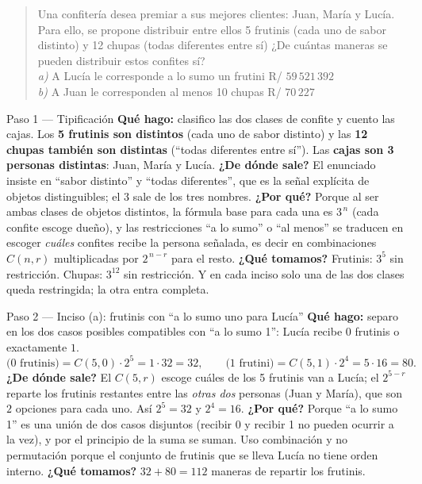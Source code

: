 \documentclass[11pt]{article}
\begin{document}
\begin{quote}
Una confitería desea premiar a sus mejores clientes: Juan, María y Lucía. Para ello, se propone distribuir entre ellos 5 frutinis (cada uno de sabor distinto) y 12 chupas (todas diferentes entre sí) ¿De cuántas maneras se pueden distribuir estos confites sí?\\
\textit{a)} A Lucía le corresponde a lo sumo un frutini \hfill R/ $59\,521\,392$\\
\textit{b)} A Juan le corresponden al menos 10 chupas \hfill R/ $70\,227$
\end{quote}

\begin{paso}{Paso 1 --- Tipificación}
\textbf{Qué hago:} clasifico las dos clases de confite y cuento las cajas.
Los \textbf{5 frutinis son distintos} (cada uno de sabor distinto) y las \textbf{12 chupas también son distintas} (``todas diferentes entre sí''). Las \textbf{cajas son 3 personas distintas}: Juan, María y Lucía.
\textbf{¿De dónde sale?} El enunciado insiste en ``sabor distinto'' y ``todas diferentes'', que es la señal explícita de objetos distinguibles; el $3$ sale de los tres nombres.
\textbf{¿Por qué?} Porque al ser ambas clases de objetos distintos, la fórmula base para cada una es $3^{\,n}$ (cada confite escoge dueño), y las restricciones ``a lo sumo'' o ``al menos'' se traducen en escoger \emph{cuáles} confites recibe la persona señalada, es decir en combinaciones $C(n,r)$ multiplicadas por $2^{\,n-r}$ para el resto.
\textbf{¿Qué tomamos?} Frutinis: $3^5$ sin restricción. Chupas: $3^{12}$ sin restricción. Y en cada inciso solo una de las dos clases queda restringida; la otra entra completa.
\end{paso}

\begin{paso}{Paso 2 --- Inciso (a): frutinis con ``a lo sumo uno para Lucía''}
\textbf{Qué hago:} separo en los dos casos posibles compatibles con ``a lo sumo 1'': Lucía recibe $0$ frutinis o exactamente $1$.
\[
\text{(0 frutinis)}=C(5,0)\cdot 2^5=1\cdot 32=32,\qquad
\text{(1 frutini)}=C(5,1)\cdot 2^4=5\cdot 16=80 .
\]
\textbf{¿De dónde sale?} El $C(5,r)$ escoge cuáles de los 5 frutinis van a Lucía; el $2^{5-r}$ reparte los frutinis restantes entre las \emph{otras dos} personas (Juan y María), que son $2$ opciones para cada uno. Así $2^5=32$ y $2^4=16$.
\textbf{¿Por qué?} Porque ``a lo sumo 1'' es una unión de dos casos disjuntos (recibir 0 y recibir 1 no pueden ocurrir a la vez), y por el principio de la suma se suman. Uso combinación y no permutación porque el conjunto de frutinis que se lleva Lucía no tiene orden interno.
\textbf{¿Qué tomamos?} $32+80=112$ maneras de repartir los frutinis.
\end{paso}
\end{document}
